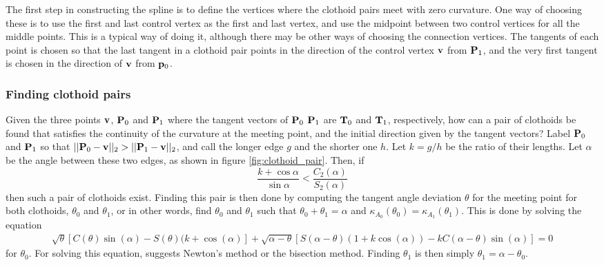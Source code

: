 The first step in constructing the spline is to define the vertices where the clothoid pairs meet with zero curvature. One way of choosing these is to use the first and last control vertex as the first and last vertex, and use the midpoint between two control vertices for all the middle points. This is a typical way of doing it, although there may be other ways of choosing the connection vertices. The tangents of each point is chosen so that the last tangent in a clothoid pair points in the direction of the control vertex $\mathbf{v}$ from $\mathbf{P}_1$, and the very first tangent is chosen in the direction of $\mathbf{v}$ from $\mathbf{p}_0$. 

\subsubsection{Finding clothoid pairs}
Given the three points $\mathbf{v}$, $\mathbf{P}_0$ and $\mathbf{P}_1$ where the tangent vectors of ${\mathbf P}_0$ ${\mathbf P}_1$ are ${\mathbf T}_0$ and ${\mathbf T}_1$, respectively, how can a pair of clothoids be found that satisfies the continuity of the curvature at the meeting point, and the initial direction given by the tangent vectors? Label ${\mathbf P}_0$ and ${\mathbf P}_1$ so that $||{\mathbf P}_0-\mathbf{v}||_2 > ||{\mathbf P}_1-\mathbf{v}||_2$, and call the longer edge $g$ and the shorter one $h$. Let $k=g/h$ be the ratio of their lengths. Let $\alpha$ be the angle between these two edges, as shown in figure \ref{fig:clothoid_pair}. Then, if
\begin{equation}
\frac{k + \cos{\alpha}}{\sin \alpha} < \frac{C_2(\alpha)}{S_2(\alpha)}
\label{eq:clothoid_asymmetry_condition}
\end{equation}
then such a pair of clothoids exist.\cite{clothoid} Finding this pair is then done by computing the tangent angle deviation $\theta$ for the meeting point for both clothoids, $\theta_0$ and $\theta_1$, or in other words, find $\theta_0$ and $\theta_1$ such that $\theta_0 + \theta_1 = \alpha$ and $\kappa_{A_0}(\theta_0) = \kappa_{A_1}(\theta_1)$. This is done by solving the equation 
\begin{align}
\sqrt{\theta}[C(\theta)\sin(\alpha) - S(\theta)(k+\cos(\alpha)] + \sqrt{\alpha-\theta}[S(\alpha-\theta)(1+k\cos(\alpha)) - kC(\alpha - \theta)\sin(\alpha)] = 0\label{eq:theta0equation}
\end{align}
for $\theta_0$. For solving this equation, \cite{clothoid} suggests Newton's method or the bisection method. Finding $\theta_1$ is then simply $\theta_1 = \alpha-\theta_0$.

